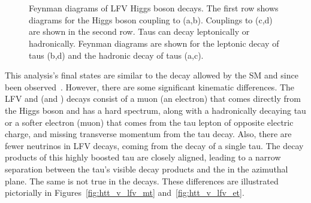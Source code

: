 \begin{figure}[htbp]
  \centering
   \\
   \\
  \caption{Feynman diagrams of LFV Higgs boson decays. The first row shows diagrams for the Higgs boson coupling to \mutau (a,b). Couplings to \etau (c,d) are shown in the second row. Taus can decay leptonically or hadronically. Feynman diagrams are shown for the leptonic decay of taus (b,d) and the hadronic decay of taus (a,c).}
  \label{fig:feynman}
\end{figure}

This analysis's final states are similar to the \Htt decay allowed by the SM and since been observed~\cite{Sirunyan:2017khh}. However, there are some significant kinematic differences. The LFV \muhad and \mue (\ehad and \emu) decays consist of a muon (an electron) that comes directly from the Higgs boson and has a hard \pt spectrum, along with a hadronically decaying tau or a softer electron (muon) that comes from the tau lepton of opposite electric charge, and missing transverse momentum from the tau decay. Also, there are fewer neutrinos in LFV decays, coming from the decay of a single tau. The decay products of this highly boosted tau are closely aligned, leading to a narrow separation between the tau's visible decay products and the \ptvecmiss in the azimuthal plane. The same is not true in the \Htt decays. These differences are illustrated pictorially in Figures~\ref{fig:htt_v_lfv_mt} and~\ref{fig:htt_v_lfv_et}.

